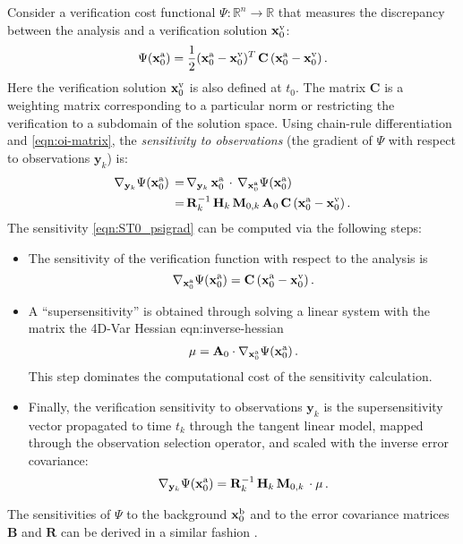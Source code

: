 \documentclass[final,sort&compress]{elsarticle}
\newcommand{\M}{\mathbf{M}}
\newcommand{\HH}{\mathbf H}
\newcommand{\A}{\mathbf{A}}
\newcommand{\B}{\mathbf{B}}
\newcommand{\C}{\mathbf{C}}
\newcommand{\R}{\mathbf{R}}
\newcommand{\xb}{ \mathbf{x}^{\rm b} }
\newcommand{\xa}{ \mathbf{x}^{\rm a} }
\newcommand{\xv}{ \mathbf{x}^{\rm v} }
\newcommand{\y}{ \mathbf{y} }
\begin{document}
Consider a verification cost functional $\Psi : \mathbb{R}^n \rightarrow \mathbb{R}$
that measures the discrepancy between the analysis and a verification solution $\xv_0$:
\begin{align}
\label{eqn:ST0_psifun}
 \Psi ( \xa_0 ) = \frac{1}{2}(\xa_0 - \xv_0)^T \, \C \, (\xa_0 - \xv_0)\,.
\end{align}
Here the verification solution $\xv_0$ is also defined at $t_0$. The matrix $\C$ is a weighting matrix corresponding to a particular norm
or restricting the verification to a subdomain of the solution space. 
Using chain-rule differentiation and \eqref{eqn:oi-matrix}, 
the \emph{sensitivity to observations} (the gradient of $\Psi$ with respect to observations $\y_k$) is:
\begin{align}
\label{eqn:ST0_psigrad}
\nabla_{\y_k} \Psi ( \xa_0 ) \,=&\, \nabla_{\y_k}\, \xa_0 \, \cdot \, \nabla_{\xa_0} \Psi ( \xa_0 ) \\
\nonumber                            \,=&\, \R_k^{-1}\, \HH_k\, \M_{0,k}\, \A_0 \, \C \, (\xa_0 - \xv_0)\,.
\end{align}
The sensitivity \eqref{eqn:ST0_psigrad} can be computed via the following steps:
\begin{itemize}
\item The sensitivity of the verification function with respect to the analysis is 
 \[
  \nabla_{\xa_0} \Psi(\xa_0) = \C \, (\xa_0 - \xv_0)\,.
 \]
\item A ``supersensitivity'' is obtained through solving a linear system with
the matrix the 4D-Var Hessian {eqn:inverse-hessian} 
 \begin{align}
  \mu = \A_0 \cdot \nabla_{\xa_0} \Psi(\xa_0)\,.
  \label{eqn:ST1_supersens}
 \end{align}
This step dominates the computational cost of the sensitivity calculation.
\item Finally, the verification sensitivity to observations $\y_k$ is the
supersensitivity vector propagated to time $t_k$ through the tangent linear model, 
mapped through the observation selection operator, and scaled with the inverse error covariance:
 \begin{align}
  \nabla_{\y_k} \Psi(\xa_0) = \R_k^{-1}\, \HH_k\, \M_{0,k}\, \cdot \mu\,.
  \label{eqn:ST2_obssens}
 \end{align}
\end{itemize}
The sensitivities of $\Psi$ to the background $\xb_0$ and to the error covariance matrices $\B$ and $\R$
can be derived in a similar fashion \cite{Daescu_2008}.
\end{document}
